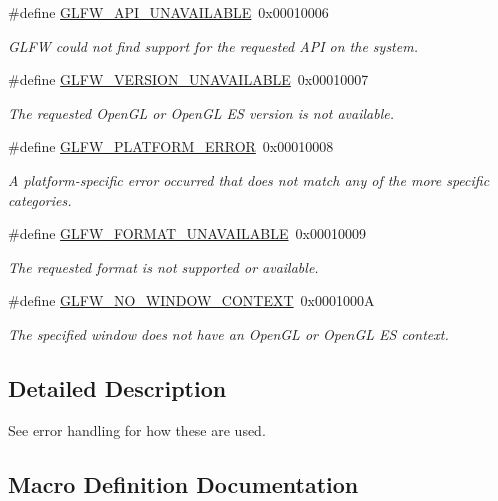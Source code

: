 \begin{DoxyCompactItemize}
\#define \hyperlink{group__errors_ga56882b290db23261cc6c053c40c2d08e}{G\+L\+F\+W\+\_\+\+A\+P\+I\+\_\+\+U\+N\+A\+V\+A\+I\+L\+A\+B\+LE}~0x00010006
\begin{DoxyCompactList}\small\item\em G\+L\+FW could not find support for the requested A\+PI on the system. \end{DoxyCompactList}\item 
\#define \hyperlink{group__errors_gad16c5565b4a69f9c2a9ac2c0dbc89462}{G\+L\+F\+W\+\_\+\+V\+E\+R\+S\+I\+O\+N\+\_\+\+U\+N\+A\+V\+A\+I\+L\+A\+B\+LE}~0x00010007
\begin{DoxyCompactList}\small\item\em The requested Open\+GL or Open\+GL ES version is not available. \end{DoxyCompactList}\item 
\#define \hyperlink{group__errors_gad44162d78100ea5e87cdd38426b8c7a1}{G\+L\+F\+W\+\_\+\+P\+L\+A\+T\+F\+O\+R\+M\+\_\+\+E\+R\+R\+OR}~0x00010008
\begin{DoxyCompactList}\small\item\em A platform-\/specific error occurred that does not match any of the more specific categories. \end{DoxyCompactList}\item 
\#define \hyperlink{group__errors_ga196e125ef261d94184e2b55c05762f14}{G\+L\+F\+W\+\_\+\+F\+O\+R\+M\+A\+T\+\_\+\+U\+N\+A\+V\+A\+I\+L\+A\+B\+LE}~0x00010009
\begin{DoxyCompactList}\small\item\em The requested format is not supported or available. \end{DoxyCompactList}\item 
\#define \hyperlink{group__errors_gacff24d2757da752ae4c80bf452356487}{G\+L\+F\+W\+\_\+\+N\+O\+\_\+\+W\+I\+N\+D\+O\+W\+\_\+\+C\+O\+N\+T\+E\+XT}~0x0001000A
\begin{DoxyCompactList}\small\item\em The specified window does not have an Open\+GL or Open\+GL ES context. \end{DoxyCompactList}\end{DoxyCompactItemize}


\subsection{Detailed Description}
See error handling for how these are used. 

\subsection{Macro Definition Documentation}
\mbox{\label{group__errors_ga56882b290db23261cc6c053c40c2d08e}} 
